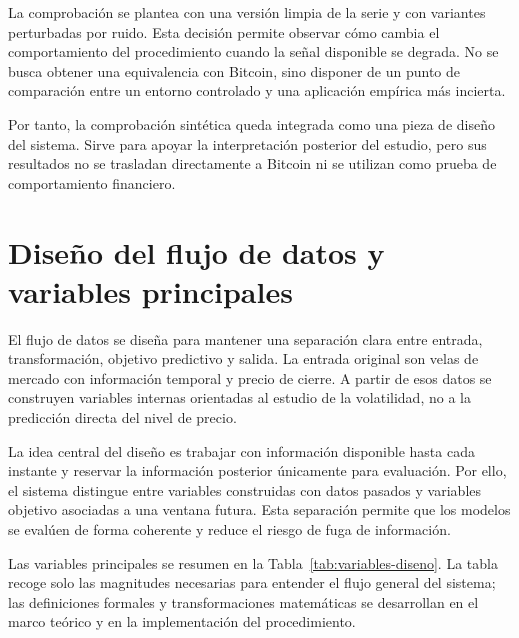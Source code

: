 La comprobación se plantea con una versión limpia de la serie y con variantes perturbadas por ruido. Esta decisión permite observar cómo cambia el comportamiento del procedimiento cuando la señal disponible se degrada. No se busca obtener una equivalencia con Bitcoin, sino disponer de un punto de comparación entre un entorno controlado y una aplicación empírica más incierta.

Por tanto, la comprobación sintética queda integrada como una pieza de diseño del sistema. Sirve para apoyar la interpretación posterior del estudio, pero sus resultados no se trasladan directamente a Bitcoin ni se utilizan como prueba de comportamiento financiero.

\section{Diseño del flujo de datos y variables principales}\label{sec:flujo-datos}

El flujo de datos se diseña para mantener una separación clara entre entrada, transformación, objetivo predictivo y salida. La entrada original son velas de mercado con información temporal y precio de cierre. A partir de esos datos se construyen variables internas orientadas al estudio de la volatilidad, no a la predicción directa del nivel de precio.

La idea central del diseño es trabajar con información disponible hasta cada instante y reservar la información posterior únicamente para evaluación. Por ello, el sistema distingue entre variables construidas con datos pasados y variables objetivo asociadas a una ventana futura. Esta separación permite que los modelos se evalúen de forma coherente y reduce el riesgo de fuga de información.

Las variables principales se resumen en la Tabla~\ref{tab:variables-diseno}. La tabla recoge solo las magnitudes necesarias para entender el flujo general del sistema; las definiciones formales y transformaciones matemáticas se desarrollan en el marco teórico y en la implementación del procedimiento.

